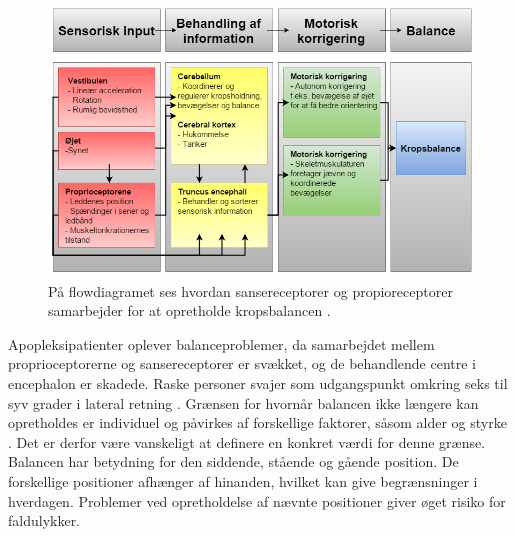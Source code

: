 \begin{figure}[H]
	\centering
	\includegraphics[scale=0.55]{figures/bProblemanalyse/Balance-Flowdiagram.png}
	\caption{På flowdiagramet ses hvordan sansereceptorer og propioreceptorer samarbejder for at opretholde kropsbalancen \cite{watson2015}.}
	\label{flowbalance1}
\end{figure}

\noindent Apopleksipatienter oplever balanceproblemer, da samarbejdet mellem proprioceptorerne og sansereceptorer er svækket, og de behandlende centre i encephalon er skadede. \cite{Martini2012} Raske personer svajer som udgangspunkt omkring seks til syv grader i lateral retning \cite{Wang2010,Huo1999}. Grænsen for hvornår balancen ikke længere kan opretholdes er individuel og påvirkes af forskellige faktorer, såsom alder og styrke \cite{Huo1999}. Det er derfor være vanskeligt at definere en konkret værdi for denne grænse. \\ 
Balancen har betydning for den siddende, stående og gående position. De forskellige positioner afhænger af hinanden, hvilket kan give begrænsninger i hverdagen. Problemer ved opretholdelse af nævnte positioner giver øget risiko for faldulykker. \cite{Karnath2003} 

